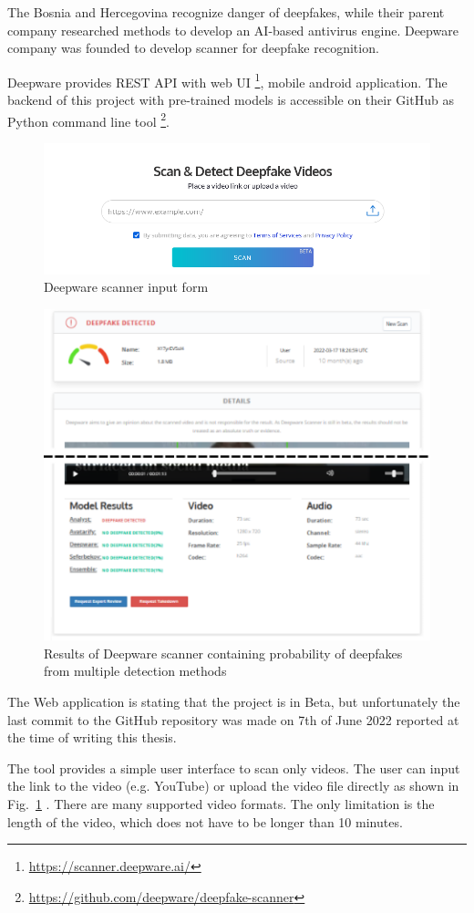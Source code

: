 The Bosnia and Hercegovina recognize danger of deepfakes, while their parent company researched methods to develop an AI-based antivirus engine. Deepware company was founded to develop scanner for deepfake recognition.

Deepware provides REST API with web UI \footnote{\url{https://scanner.deepware.ai/}}, mobile android application. The backend of this project with pre-trained models is accessible on their GitHub as Python command line tool \footnote{\url{ https://github.com/deepware/deepfake-scanner}}.

\begin{figure}[H]
    \centering
    \includegraphics[width=.65\linewidth]{other-fig/deepware_input.png}
    \caption{Deepware scanner input form}
    \label{fig:deepware_input}
\end{figure}

\begin{figure}[H]
    \centering
    \includegraphics[width=.58\linewidth]{other-fig/deepware_results.png}
    \caption{Results of Deepware scanner containing probability of deepfakes from multiple detection methods}
    \label{fig:deepware_results}
\end{figure}

The Web application is stating that the project is in Beta, but unfortunately the last commit to the GitHub repository was made on 7th of June 2022 reported at the time of writing this thesis.

The tool provides a simple user interface to scan only videos. The user can input the link to the video (e.g. YouTube) or upload the video file directly as shown in Fig.~\ref{fig:deepware_input} . There are many supported video formats. The only limitation is the length of the video, which does not have to be longer than 10 minutes.

